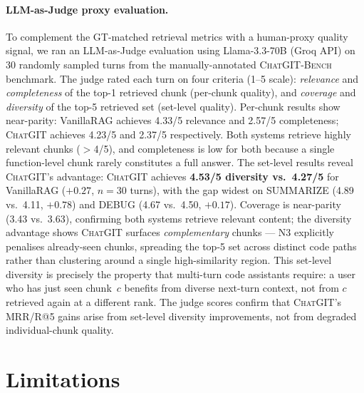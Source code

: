 \documentclass[runningheads]{llncs}
\newcommand{\chatgit}{\textsc{ChatGIT}\xspace}
\newcommand{\conv}{\textsc{ChatGIT-Bench}\xspace}
\begin{document}
\paragraph{LLM-as-Judge proxy evaluation.}
To complement the GT-matched retrieval metrics with a human-proxy quality
signal, we ran an LLM-as-Judge evaluation using Llama-3.3-70B (Groq API)
on 30 randomly sampled turns from the manually-annotated \conv benchmark.
The judge rated each turn on four criteria (1--5 scale): \emph{relevance}
and \emph{completeness} of the top-1 retrieved chunk (per-chunk quality),
and \emph{coverage} and \emph{diversity} of the top-5 retrieved set
(set-level quality). Per-chunk results show near-parity: VanillaRAG
achieves 4.33/5 relevance and 2.57/5 completeness; \chatgit achieves
4.23/5 and 2.37/5 respectively. Both systems retrieve highly relevant
chunks ($>$4/5), and completeness is low for both because a single
function-level chunk rarely constitutes a full answer.
The set-level results reveal \chatgit's advantage:
\chatgit achieves \textbf{4.53/5 diversity vs.\ 4.27/5} for VanillaRAG
($+0.27$, $n{=}30$ turns), with the gap widest on SUMMARIZE
(4.89 vs.\ 4.11, $+0.78$) and DEBUG (4.67 vs.\ 4.50, $+0.17$).
Coverage is near-parity (3.43 vs.\ 3.63), confirming both systems
retrieve relevant content; the diversity advantage shows \chatgit
surfaces \emph{complementary} chunks --- N3 explicitly penalises
already-seen chunks, spreading the top-5 set across distinct code paths
rather than clustering around a single high-similarity region.
This set-level diversity is precisely the property that multi-turn code
assistants require: a user who has just seen chunk~$c$ benefits from
diverse next-turn context, not from $c$ retrieved again at a different
rank. The judge scores confirm that \chatgit's MRR/R@5 gains arise
from set-level diversity improvements, not from degraded individual-chunk quality.

\section{Limitations}
\label{sec:limitations}
\end{document}
